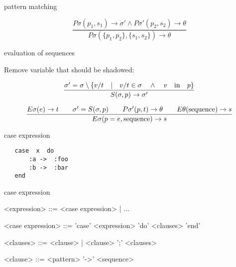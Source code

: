 \begin{frame}{pattern matching}
  
 $$\frac{P\sigma(p_1, s_1) \rightarrow \sigma' \wedge P\sigma'(p_2, s_2) \rightarrow \theta}{P\sigma(\lbrace p_1, p_2 \rbrace  , \lbrace s_1, s_2 \rbrace) \rightarrow \theta}$$

\end{frame}

\begin{frame}{evaluation of sequences}

  Remove variable that should be shadowed:

  \pause\vspace{10pt}
  
$$\frac{\sigma' = \sigma \setminus \lbrace v/t \quad | \quad v/t \in \sigma \quad \wedge \quad  v \quad {\rm in} \quad p\rbrace}{S(\sigma, p) \rightarrow \sigma'}$$

\pause\vspace{20pt}

$$\frac{   
  E\sigma(e) \rightarrow t
  \qquad \sigma' = S(\sigma, p)
  \qquad P\sigma'(p, t) \rightarrow \theta
  \qquad E\theta({\rm sequence}) \rightarrow s
}{E\sigma(p = e, {\rm sequence}) \rightarrow s}$$ 


\pause\vspace{20pt}{\em First evaluate the pattern matching expression, if it succeeds then continue with the new environment.}
\end{frame}

\begin{frame}[fragile]{case expression}

\begin{verbatim}
   case  x  do
       :a ->  :foo
       :b ->  :bar
   end
\end{verbatim}

\end{frame}

\begin{frame}{case expression}

\begin{grammar}
     <expression> ::=  <case expression> | ...  

     <case expression> ::= 'case' <expression> 'do' <clauses>  'end' 

     <clauses> ::=   <clause> | <clause> ';' <clauses>

     <clause> ::=  <pattern> '->' <sequence>
\end{grammar}
\end{frame}

